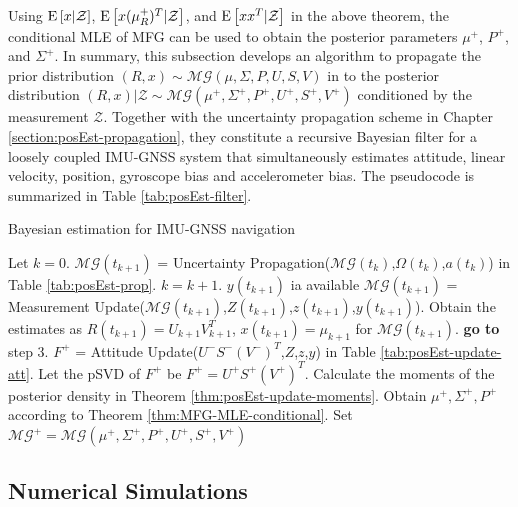 Using $\mathrm{E}\left[ x|\mathcal{Z} \right]$, $\mathrm{E}\left[ x(\mu_R^+)^T|\mathcal{Z} \right]$, and $\mathrm{E}\left[ xx^T|\mathcal{Z} \right]$ in the above theorem, the conditional MLE of MFG can be used to obtain the posterior parameters $\mu^+$, $P^+$, and $\Sigma^+$.
In summary, this subsection develops an algorithm to propagate the prior distribution $(R,x) \sim \mathcal{MG}(\mu,\allowbreak \Sigma,\allowbreak P,\allowbreak U,\allowbreak S,\allowbreak V)$ in to the posterior distribution $(R,x)|\mathcal{Z} \sim \mathcal{MG}(\mu^+,\allowbreak \Sigma^+,\allowbreak P^+,\allowbreak U^+,\allowbreak S^+,\allowbreak V^+)$ conditioned by the measurement $\mathcal{Z}$.
Together with the uncertainty propagation scheme in Chapter \ref{section:posEst-propagation}, they constitute a recursive Bayesian filter for a loosely coupled IMU-GNSS system that simultaneously estimates attitude, linear velocity, position, gyroscope bias and accelerometer bias.
The pseudocode is summarized in Table \ref{tab:posEst-filter}.

\begin{table}
	\caption{Bayesian estimation for IMU-GNSS navigation \label{tab:posEst-filter}}
	\begin{algorithmic}[1]
		\algrule[0.8pt]
		\algrule
		\State Let $k=0$.
		\Repeat
		\State $\mathcal{MG}(t_{k+1})$ = Uncertainty Propagation($\mathcal{MG}(t_k)$,$\Omega(t_k)$,$a(t_k)$) in Table \ref{tab:posEst-prop}.
		\State $k=k+1$.
		\Until $y(t_{k+1})$ ia available
		\State $\mathcal{MG}(t_{k+1})$ = Measurement Update($\mathcal{MG}(t_{k+1})$,$Z(t_{k+1})$,$z(t_{k+1})$,$y(t_{k+1})$).
		\State Obtain the estimates as $R(t_{k+1})=U_{k+1}V_{k+1}^T$, $x(t_{k+1})=\mu_{k+1}$ for $\mathcal{MG}(t_{k+1})$.
		\State \textbf{go to} step 3.
		\EndProcedure
		\algrule
		\State $F^+$ = Attitude Update($U^-S^-(V^-)^T$,$Z$,$z$,$y$) in Table \ref{tab:posEst-update-att}.
		\State Let the pSVD of $F^+$ be $F^+ = U^+S^+(V^+)^T$.
		\State Calculate the moments of the posterior density in Theorem \ref{thm:posEst-update-moments}.
		\State Obtain $\mu^+,\Sigma^+,P^+$ according to Theorem \ref{thm:MFG-MLE-conditional}.
		\State Set $\mathcal{MG}^+ = \mathcal{MG}(\mu^+,\Sigma^+,P^+,U^+,S^+,V^+)$
		\EndProcedure
		\algrule[0.8pt]
	\end{algorithmic}
\end{table}

\subsection{Numerical Simulations}

